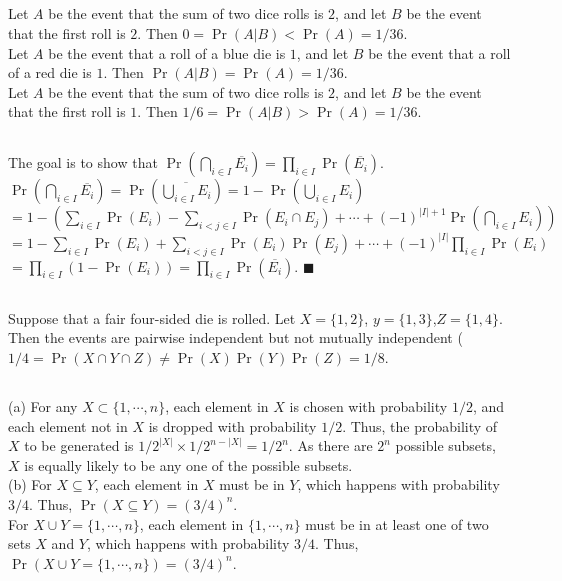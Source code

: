 \documentclass{article}
\begin{document}
\subsection{}
Let $A$ be the event that the sum of two dice rolls is $2$, and let $B$ be the event that the first roll is $2$. Then $0=\Pr(A|B)<\Pr(A)=1/36$.\\
Let $A$ be the event that a roll of a blue die is $1$, and let $B$ be the event that a roll of a red die is $1$. Then $\Pr(A|B)=\Pr(A)=1/36$.\\
Let $A$ be the event that the sum of two dice rolls is $2$, and let $B$ be the event that the first roll is $1$. Then $1/6=\Pr(A|B)>\Pr(A)=1/36$.
\subsection{}
The goal is to show that $\Pr\left(\bigcap\limits_{i\in I} \overline{E_i}\right)=\prod\limits_{i\in I}\Pr(\overline{E_i})$.\\
$\Pr\left(\bigcap\limits_{i\in I} \overline{E_i}\right)=\Pr\left(\overline{\bigcup\limits_{i\in I}E_i}\right) = 1-\Pr\left(\bigcup\limits_{i\in I}E_i\right)$\\
$=1-\left(\sum\limits_{i\in I}\Pr(E_i)-\sum\limits_{i<j\in I}\Pr(E_i\cap E_j)+\cdots+(-1)^{|I|+1}\Pr\left(\bigcap\limits_{i\in I}E_i\right)\right)$\\
$=1-\sum\limits_{i\in I}\Pr(E_i)+\sum\limits_{i<j\in I}\Pr(E_i)\Pr(E_j)+\cdots+(-1)^{|I|}\prod\limits_{i\in I}\Pr(E_i)$\\
$=\prod\limits_{i\in I}(1-\Pr(E_i))=\prod\limits_{i\in I}\Pr(\overline{E_i})$. $\blacksquare$
\subsection{}
Suppose that a fair four-sided die is rolled. Let $X=\{1,2\}$, $y=\{1,3\}$,$Z=\{1,4\}$. Then the events are pairwise independent but not mutually independent ($1/4=\Pr(X\cap Y\cap Z) \neq \Pr(X)\Pr(Y)\Pr(Z)=1/8$.
\subsection{}
(a) For any $X \subset \{1,\cdots,n\}$, each element in $X$ is chosen with probability $1/2$, and each element not in $X$ is dropped with probability $1/2$.
Thus, the probability of $X$ to be generated is $1/2^{|X|}\times1/2^{n-|X|}=1/2^n$.
As there are $2^n$ possible subsets, $X$ is equally likely to be any one of the possible subsets.\\
(b) For $X\subseteq Y$, each element in $X$ must be in $Y$, which happens with probability $3/4$. Thus, $\Pr(X\subseteq Y)=(3/4)^n$.\\
For $X\cup Y = \{1,\cdots,n\}$, each element in $\{1,\cdots,n\}$ must be in at least one of two sets $X$ and $Y$, which happens with probability $3/4$. Thus, $\Pr(X\cup Y = \{1,\cdots,n\})=(3/4)^n$.
\end{document}
